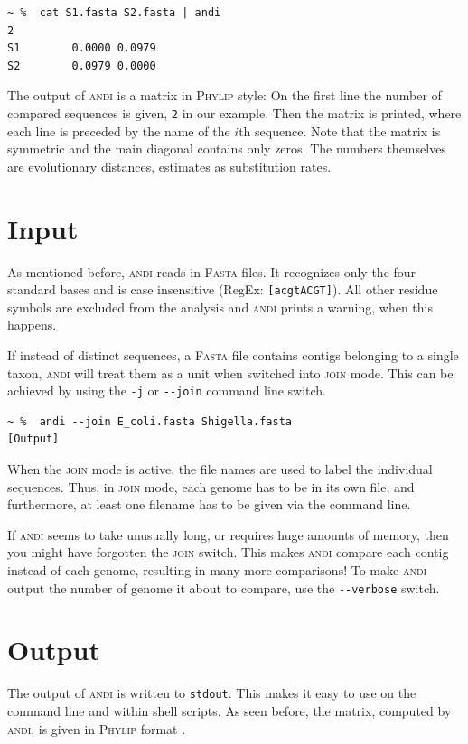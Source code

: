 \documentclass[a4paper,
  10pt,
  english,
  DIV=12,
  BCOR=8mm]{scrbook}
\newcommand{\algo}[1]{\textsc{{#1}}}
\newcommand{\andi}{\algo{andi} }
\begin{document}
\begin{lstlisting}
~ %  cat S1.fasta S2.fasta | andi
2
S1        0.0000 0.0979
S2        0.0979 0.0000
\end{lstlisting}

The output of \andi is a matrix in \algo{Phylip} style: On the first line the number of compared sequences is given, \lstinline!2! in our example. Then the matrix is printed, where each line is preceded by the name of the $i$th sequence. Note that the matrix is symmetric and the main diagonal contains only zeros. The numbers themselves are evolutionary distances, estimates as substitution rates.


\section{Input} \label{sec:join}

As mentioned before, \andi reads in \algo{Fasta} files. It recognizes only the four standard bases and is case insensitive (RegEx: \lstinline![acgtACGT]!). All other residue symbols are excluded from the analysis and \andi prints a warning, when this happens.

If instead of distinct sequences, a \algo{Fasta} file contains contigs belonging to a single taxon, \andi will treat them as a unit when switched into \algo{join} mode. This can be achieved by using the \lstinline!-j! or \lstinline!--join! command line switch.

\begin{lstlisting}
~ %  andi --join E_coli.fasta Shigella.fasta
[Output]
\end{lstlisting}

When the \algo{join} mode is active, the file names are used to label the individual sequences. Thus, in \algo{join} mode, each genome has to be in its own file, and furthermore, at least one filename has to be given via the command line.

If \andi seems to take unusually long, or requires huge amounts of memory, then you might have forgotten the \algo{join} switch. This makes \andi compare each contig instead of each genome, resulting in many more comparisons! To make \andi output the number of genome it about to compare, use the \lstinline$--verbose$ switch.

\section{Output}

The output of \andi is written to \lstinline$stdout$. This makes it easy to use on the command line and within shell scripts. As seen before, the matrix, computed by \algo{andi}, is given in \algo{Phylip} format \cite{phylip}.
\end{document}
